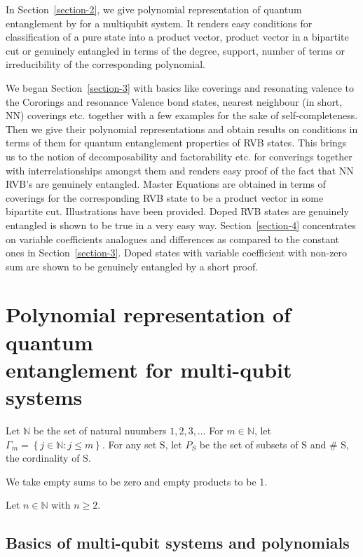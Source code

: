 \documentclass[a4paper,12pt]{article}
\theoremstyle{definition}
\theoremstyle{underlinethm}
\theoremstyle{definition}
\begin{document}
In Section~\eqref{section-2}, we give polynomial representation of quantum entanglement by for a multiqubit system. It renders easy conditions for classification of a pure state into a product vector, product vector in a bipartite cut or genuinely entangled in terms of the degree, support, number of terms or irreducibility  of the corresponding polynomial.   

We began Section~\eqref{section-3} with basics like coverings and resonating valence to the Cororings and resonance Valence bond states, nearest neighbour (in short, NN) coverings etc. together with a few examples for the sake of self-completeness. Then we give their polynomial representations and obtain results on conditions in terms of them for quantum entanglement properties of RVB states. This brings us to the notion of decomposability  and factorability  etc. for converings together with interrelationships amongst them and renders easy proof of the fact that NN RVB's are genuinely entangled. Master Equations are obtained in terms of coverings for the corresponding RVB state to be a product vector in some bipartite cut. Illustrations have been provided. Doped RVB states are genuinely entangled is shown to be true in a very easy way. Section~\eqref{section-4} concentrates on variable coefficients analogues and differences as compared to the constant ones in Section~\eqref{section-3}. Doped states with variable coefficient with non-zero sum are shown to be genuinely entangled by a short proof.


\section{Polynomial representation of quantum\\ entanglement for multi-qubit systems}\label{section-2}

Let $\mathbb{N}$ be the set of natural nuumbers $1,2,3, \ldots$ For $m\in \mathbb{N}$, let $\Gamma_{m}= \left\{ j \in \mathbb{N} : j \leq m \right\}$. For any set S, let $P_{S}$ be the set of subsets of S and $\#$ S, the cordinality of S.

We take empty sums to be zero and empty products to be 1.

Let $n \in \mathbb{N}$ with $n \geq 2$.

\subsection{Basics of multi-qubit systems and polynomials}\label{subsection-2.1}
\end{document}
